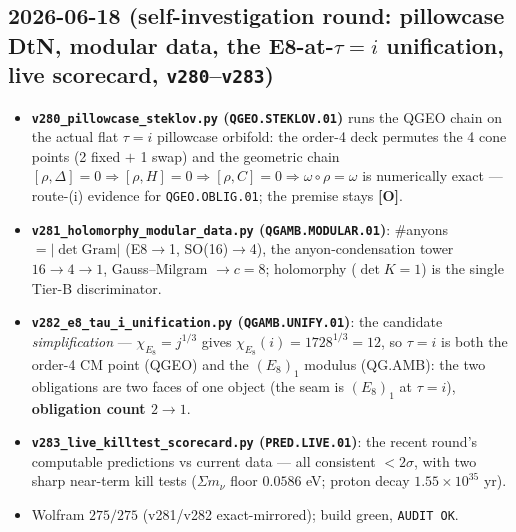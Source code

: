 \documentclass[11pt]{article}
\providecommand{\mO}{\textbf{[O]}}\providecommand{\mX}{\textbf{[X]}}
\begin{document}
\subsection*{2026-06-18 (self-investigation round: pillowcase DtN, modular data, the E8-at-$\tau{=}i$ unification, live scorecard, \texttt{v280}--\texttt{v283})}
\begin{itemize}
\item \textbf{\texttt{v280\_pillowcase\_steklov.py} (\texttt{QGEO.STEKLOV.01})} runs the QGEO chain on the actual
  flat $\tau{=}i$ pillowcase orbifold: the order-4 deck permutes the 4 cone points (2 fixed $+$ 1 swap) and the
  geometric chain $[\rho,\Delta]{=}0\Rightarrow[\rho,H]{=}0\Rightarrow[\rho,C]{=}0\Rightarrow\omega\circ\rho{=}\omega$
  is numerically exact --- route-(i) evidence for \texttt{QGEO.OBLIG.01}; the premise stays \mO.
\item \textbf{\texttt{v281\_holomorphy\_modular\_data.py} (\texttt{QGAMB.MODULAR.01})}: \#anyons $=|\det\mathrm{Gram}|$
  (E8$\to$1, SO(16)$\to$4), the anyon-condensation tower $16\to4\to1$, Gauss--Milgram $\to c{=}8$; holomorphy
  ($\det K{=}1$) is the single Tier-B discriminator.
\item \textbf{\texttt{v282\_e8\_tau\_i\_unification.py} (\texttt{QGAMB.UNIFY.01})}: the candidate
  \emph{simplification} --- $\chi_{E_8}{=}j^{1/3}$ gives $\chi_{E_8}(i){=}1728^{1/3}{=}12$, so $\tau{=}i$ is both
  the order-4 CM point (QGEO) and the $(E_8)_1$ modulus (QG.AMB): the two obligations are two faces of one object
  (the seam is $(E_8)_1$ at $\tau{=}i$), \textbf{obligation count $2\to1$}.
\item \textbf{\texttt{v283\_live\_killtest\_scorecard.py} (\texttt{PRED.LIVE.01})}: the recent round's
  computable predictions vs current data --- all consistent $<2\sigma$, with two sharp near-term kill tests
  ($\Sigma m_\nu$ floor $0.0586$ eV; proton decay $1.55{\times}10^{35}$ yr).
\item Wolfram $275/275$ (v281/v282 exact-mirrored); build green, \texttt{AUDIT OK}.
\end{itemize}
\end{document}
